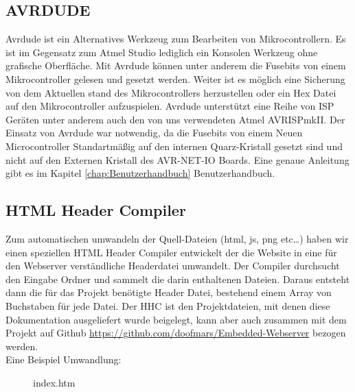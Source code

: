 
\subsection{AVRDUDE}

Avrdude ist ein Alternatives Werkzeug zum Bearbeiten von Mikrocontrollern. Es
ist im Gegensatz zum Atmel Studio lediglich ein Konsolen Werkzeug ohne
grafische Oberfläche. Mit Avrdude können unter anderem die Fusebits von einem
Mikrocontroller gelesen und gesetzt werden. Weiter ist es möglich eine Sicherung
von dem Aktuellen stand des Mikrocontrollers herzustellen oder ein Hex Datei auf
den Mikrocontroller aufzuspielen. Avrdude unterstützt eine Reihe von \ac{ISP}
Geräten unter anderem auch den von uns verwendeten Atmel AVRISPmkII. Der Einsatz von
Avrdude war notwendig, da die Fusebits von einem Neuen Microcontroller
Standartmäßig auf den internen Quarz-Kristall gesetzt sind und nicht auf den
Externen Kristall des AVR-NET-IO Boards.
Eine genaue Anleitung gibt es im Kapitel \ref{chap:Benutzerhandbuch}
Benutzerhandbuch.

\newpage

\subsection{HTML Header Compiler}
\label{chap:hintergrund.HHC}

Zum automatischen umwandeln der Quell-Dateien (html, js, png etc\ldots) haben
wir einen speziellen HTML Header Compiler entwickelt der die Website in eine
für den Webserver verständliche Headerdatei umwandelt. Der Compiler durchsucht
den Eingabe Ordner und sammelt die darin enthaltenen Dateien. Daraus entsteht
dann die für das Projekt benötigte Header Datei, bestehend einem Array von
Buchstaben für jede Datei. Der \ac{HHC} ist den Projektdateien, mit denen diese
Dokumentation ausgeliefert wurde beigelegt, kann aber auch zusammen mit dem
Projekt auf Github \url{https://github.com/doofmars/Embedded-Webserver}
bezogen werden.\\

Eine Beispiel Umwandlung: 

\begin{figure}[H]

\caption{index.htm}
\label{HHC.input}
\end{figure}


